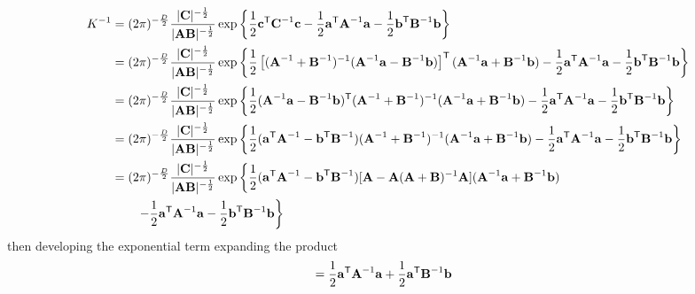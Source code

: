 \documentclass{amsmlaj}
\begin{document}
\begin{problem}
\begin{enumerate}
	\begin{equation}
		\begin{split}
						K^{-1}&=(2\pi)^{-\frac{D}{2}}\frac{|\bm{\mathbf{C}}|^{-\frac{1}{2}}}{|\bm{\mathbf{AB}}|^{-\frac{1}{2}}}
						\exp\left\{
										\frac{1}{2}\bm{\mathbf{c}}^{\mathsf{T}}\bm{\mathbf{C}}^{-1}\bm{\mathbf{c}}
										-\frac{1}{2}\bm{\mathbf{a}}^{\mathsf{T}}\bm{\mathbf{A}}^{-1}\bm{\mathbf{a}}
										-\frac{1}{2}\bm{\mathbf{b}}^{\mathsf{T}}\bm{\mathbf{B}}^{-1}\bm{\mathbf{b}}
						\right\} \\
						&=(2\pi)^{-\frac{D}{2}}\frac{|\bm{\mathbf{C}}|^{-\frac{1}{2}}}{|\bm{\mathbf{AB}}|^{-\frac{1}{2}}}
						\exp\left\{
										\frac{1}{2}\left[
														(\bm{\mathbf{A}}^{-1}+\bm{\mathbf{B}}^{-1})^{-1}(\bm{\mathbf{A}}^{-1}\bm{\mathbf{a}}-\bm{\mathbf{B}}^{-1}\bm{\mathbf{b}})
										\right]^{\mathsf{T}}(\bm{\mathbf{A}}^{-1}\bm{\mathbf{a}}+\bm{\mathbf{B}}^{-1}\bm{\mathbf{b}})
										-\frac{1}{2}\bm{\mathbf{a}}^{\mathsf{T}}\bm{\mathbf{A}}^{-1}\bm{\mathbf{a}}
										-\frac{1}{2}\bm{\mathbf{b}}^{\mathsf{T}}\bm{\mathbf{B}}^{-1}\bm{\mathbf{b}}
						\right\} \\
						&=(2\pi)^{-\frac{D}{2}}\frac{|\bm{\mathbf{C}}|^{-\frac{1}{2}}}{|\bm{\mathbf{AB}}|^{-\frac{1}{2}}}
						\exp\left\{
										\frac{1}{2}
										(\bm{\mathbf{A}}^{-1}\bm{\mathbf{a}}-\bm{\mathbf{B}}^{-1}\bm{\mathbf{b}})^{\mathsf{T}}
										(\bm{\mathbf{A}}^{-1}+\bm{\mathbf{B}}^{-1})^{-1}
										(\bm{\mathbf{A}}^{-1}\bm{\mathbf{a}}+\bm{\mathbf{B}}^{-1}\bm{\mathbf{b}})
										-\frac{1}{2}\bm{\mathbf{a}}^{\mathsf{T}}\bm{\mathbf{A}}^{-1}\bm{\mathbf{a}}
										-\frac{1}{2}\bm{\mathbf{b}}^{\mathsf{T}}\bm{\mathbf{B}}^{-1}\bm{\mathbf{b}}
						\right\} \\
						&=(2\pi)^{-\frac{D}{2}}\frac{|\bm{\mathbf{C}}|^{-\frac{1}{2}}}{|\bm{\mathbf{AB}}|^{-\frac{1}{2}}}
						\exp\left\{
										\frac{1}{2}
										(\bm{\mathbf{a}}^{\mathsf{T}}\bm{\mathbf{A}}^{-1}-\bm{\mathbf{b}}^{\mathsf{T}}\bm{\mathbf{B}}^{-1})
										(\bm{\mathbf{A}}^{-1}+\bm{\mathbf{B}}^{-1})^{-1}
										(\bm{\mathbf{A}}^{-1}\bm{\mathbf{a}}+\bm{\mathbf{B}}^{-1}\bm{\mathbf{b}})
										-\frac{1}{2}\bm{\mathbf{a}}^{\mathsf{T}}\bm{\mathbf{A}}^{-1}\bm{\mathbf{a}}
										-\frac{1}{2}\bm{\mathbf{b}}^{\mathsf{T}}\bm{\mathbf{B}}^{-1}\bm{\mathbf{b}}
						\right\} \\
						&=(2\pi)^{-\frac{D}{2}}\frac{|\bm{\mathbf{C}}|^{-\frac{1}{2}}}{|\bm{\mathbf{AB}}|^{-\frac{1}{2}}}
						\exp\left\{
										\frac{1}{2}
										(\bm{\mathbf{a}}^{\mathsf{T}}\bm{\mathbf{A}}^{-1}-\bm{\mathbf{b}}^{\mathsf{T}}\bm{\mathbf{B}}^{-1})
										[\bm{\mathbf{A}}-\bm{\mathbf{A}}(\bm{\mathbf{A}}+\bm{\mathbf{B}})^{-1}\bm{\mathbf{A}}]
										(\bm{\mathbf{A}}^{-1}\bm{\mathbf{a}}+\bm{\mathbf{B}}^{-1}\bm{\mathbf{b}})
										\right.\nonumber \\
										&\qquad\left.-\frac{1}{2}\bm{\mathbf{a}}^{\mathsf{T}}\bm{\mathbf{A}}^{-1}\bm{\mathbf{a}}
										-\frac{1}{2}\bm{\mathbf{b}}^{\mathsf{T}}\bm{\mathbf{B}}^{-1}\bm{\mathbf{b}}
						\right\}
		\end{split}
	\end{equation}
	then developing the exponential term expanding the product
	\begin{equation}
		\begin{split}
						&=\frac{1}{2}\vt{a}^\trans\vt{A}^{-1}\vt{a}
						+\frac{1}{2}\vt{a}^\trans\vt{B}^{-1}\vt{b}

\end{split}
\end{equation}
\end{enumerate}
\end{problem}
\end{document}
